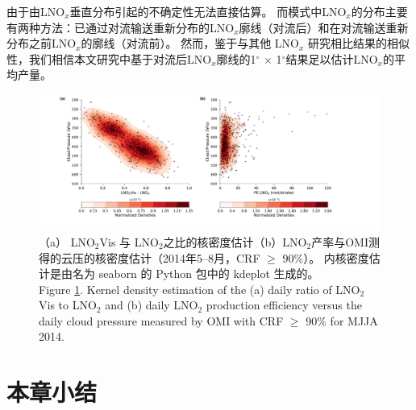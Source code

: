 由于由LNO$_x$垂直分布引起的不确定性无法直接估算。
而模式中LNO$_x$的分布主要有两种方法：已通过对流输送重新分布的LNO$_x$廓线（对流后）和在对流输送重新分布之前LNO$_x$的廓线（对流前）\citep{Allen.2012,Luo.2017}。
然而，鉴于与其他 LNO$_x$ 研究相比结果的相似性，我们相信本文研究中基于对流后LNO$_x$廓线的1$^{\circ}$ $\times$ 1$^{\circ}$结果足以估计LNO$_x$的平均产量。

\begin{figure}[t]
\includegraphics[width=15cm]{./figures/cp_ratio_lno2.pdf}
\caption{（a） LNO$_\textrm{2}$Vis 与 LNO$_\textrm{2}$之比的核密度估计（b）LNO$_\textrm{2}$产率与OMI测得的云压的核密度估计（2014年5--8月，CRF $\geq$ 90\%）。
内核密度估计是由名为 seaborn 的 Python 包中的 kdeplot 生成的。\\
Figure \ref{fig:cp_ratio_lno2}. Kernel density estimation of the (a) daily ratio of LNO$_\textrm{2}$Vis to LNO$_\textrm{2}$ and (b) daily LNO$_\textrm{2}$ production efficiency versus the daily cloud pressure measured by OMI with CRF $\geq$ 90\% for MJJA 2014.}
\label{fig:cp_ratio_lno2}
\end{figure}


\section{本章小结}
